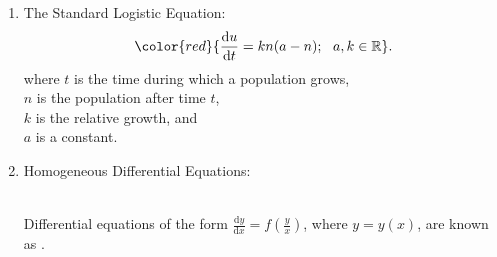 \documentclass[12pt, a4paper]{article}
\def\R{{\mathbb{R}}}
\def\d{{\mathrm{d}}}
\begin{document}
\begin{enumerate}
\begin{itemize}
$$\begin{aligned}
            \int \frac{\d y}{h(y)}&=\int g(x)\ \d x
        \end{aligned}$$
        \item Solving differential equations using separation of variables: 
        \begin{enumerate}
            \item Separate the variables such that everything involving $y$ is on one side and everything involving $x$ is on the other side. 
            \item Integrate both sides and combine the constant of integration on one side of the equation (normally the right side).
        \end{enumerate}
        \begin{example}{5.10.1}{}
            \textbf{Solve for $y$ if $\frac{\d y}{\d x}=x(1+y)e^x$.}\\
            \noindent\rule[0.1pt]{\textwidth}{1pt}
            $$\begin{aligned}
                \frac{\d y}{\d x}&=x(1+y)e^x\\
                \frac{1}{1+y}\d y&=xe^x\d x\\
                \int \frac{1}{1+y}\ \d y&=\int xe^x\ \d x\\
                {\color{green}{(=xe^x-\int e^x\ \d x}}&{\color{green}{=xe^x-e^x\ \text{[Integration by Parts]})}}\\
                \ln{|1+y|}&=xe^x-e^x+C\\
                1+y&=e^{xe^x-e^x+C}=e^{xe^x-e^x}\cdot e^C\\
                y&=Ae^{xe^x-e^x}-1\ \ \ (A=e^{C}).
            \end{aligned}$$
        \end{example}
    \end{itemize}
    \item The Standard Logistic Equation: 
    $${\color{red}{\frac{\d u}{\d t}=kn(a-n);\ \ a,k\in \R}}.$$
    where $t$ is the time during which a population grows, \\
        $n$ is the population after time $t$, \\
        $k$ is the relative growth, and \\
        $a$ is a constant. 
    \item Homogeneous Differential Equations: 
    \begin{myclaim}{ }{}
        \\Differential equations of the form $\frac{\d y}{\d x}=f\left(\frac{y}{x}\right)$, where $y=y(x)$, are known as \textbf{\color{red}{homogeneous differential equations}}.

\end{myclaim}
\end{enumerate}
\end{document}
